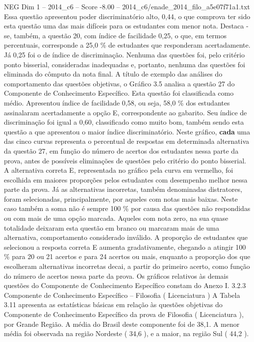 \begin{textsample}{NEG Dim 1 – 2014\_c6 – Score -8.00 – 2014\_c6/enade\_2014\_filo\_a5e07f71a1.txt}
Essa questão apresentou poder discriminatório alto, 0,44, o que comprova ter sido esta questão uma das mais difíceis para os estudantes com menor nota.
Destaca -se, também, a questão 20, com índice de facilidade 0,25, o que, em termos percentuais, corresponde a 25,0 \% de estudantes que responderam acertadamente.
Já 0,25 foi o de índice de discriminação.
Nenhuma das questões foi, pelo critério ponto bisserial, consideradas inadequadas e, portanto, nenhuma das questões foi eliminada do cômputo da nota final.
A título de exemplo das análises do comportamento das questões objetivas, o Gráfico 3.5 analisa a questão 27 do Componente de Conhecimento Específico.
Esta questão foi classificada como médio.
Apresentou índice de facilidade 0,58, ou seja, 58,0 \% dos estudantes assinalaram acertadamente a opção E, correspondente ao gabarito.
Seu índice de discriminação foi igual a 0,60, classificado como muito bom, também sendo esta questão a que apresentou o maior índice discriminatório.
Neste gráfico, \textbf{cada} uma das cinco curvas representa o percentual de respostas em determinada alternativa da questão 27, em função do número de acertos dos estudantes nessa parte da prova, antes de possíveis eliminações de questões pelo critério do ponto bisserial.
A alternativa correta E, representada no gráfico pela curva em vermelho, foi escolhida em maiores proporções pelos estudantes com desempenho melhor nessa parte da prova.
Já as alternativas incorretas, também denominadas distratores, foram selecionadas, principalmente, por aqueles com notas mais baixas.
Neste caso também a soma não é sempre 100 \% por causa das questões não respondidas ou com mais de uma opção marcada.
Aqueles com nota zero, na sua quase totalidade deixaram esta questão em branco ou marcaram mais de uma alternativa, comportamento considerado inválido.
A proporção de estudantes que selecionou a resposta correta E aumenta gradativamente, chegando a atingir 100 \% para 20 ou 21 acertos e para 24 acertos ou mais, enquanto a proporção dos que escolheram alternativas incorretas decai, a partir do primeiro acerto, como função do número de acertos nessa parte da prova.
Os gráficos relativos às demais questões do Componente de Conhecimento Específico constam do Anexo I. 3.2.3 Componente de Conhecimento Específico – Filosofia ( Licenciatura ) A Tabela 3.11 apresenta as estatísticas básicas em relação às questões objetivas do Componente de Conhecimento Específico da prova de Filosofia ( Licenciatura ), por Grande Região.
A média do Brasil deste componente foi de 38,1.
A menor média foi observada na região Nordeste ( 34,6 ), e a maior, na região Sul ( 44,2 ).

\end{textsample}
